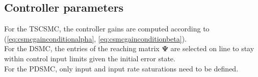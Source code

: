 \documentclass{ifacconf}
\providecommand{\mbf}[1]{\mathbf{#1}}
\newcommand{\idxPredecessor}{{\ensuremath{i-1} }}
\newcommand{\idxAxis}{{\ensuremath{p}}}
\begin{document}
\subsection{Controller parameters}
For the TSCSMC, the controller gains are computed according to (\ref{eq:csmcgainconditionalpha}, \ref{eq:csmcgainconditionbeta}).\\
For the DSMC, the entries of the reaching matrix $\mbf{\Psi}$ are selected on line to stay within control input limits given the initial error state.\\
For the PDSMC, only input and input rate saturations need to be defined.








\end{document}
